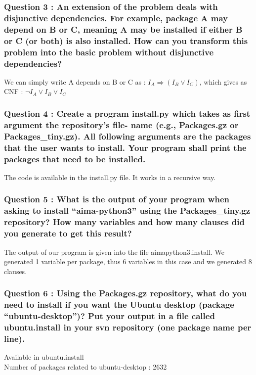 \documentclass[a4paper,10pt]{article}
\begin{document}
\subsubsection{Question 3 : An extension of the problem deals with disjunctive dependencies. For example, package A may depend on B or C, meaning A may be installed if either B or C (or both) is also installed. How can you transform this problem into the basic problem without disjunctive dependencies?}
We can simply write A depends on B or C as : $I_{A} \Rightarrow (I_{B} \vee I_{C})$, which gives as CNF : $\neg I_{A} \vee I_{B} \vee I_{C}$

\subsubsection{Question 4 : Create a program install.py which takes as first argument the repository’s file- name (e.g., Packages.gz or Packages\_tiny.gz). All following arguments are the packages that the user wants to install. Your program shall print the packages that need to be installed.}
The code is available in the install.py file. It works in a recursive way.

\subsubsection{Question 5 : What is the output of your program when asking to install “aima-python3” using the Packages\_tiny.gz repository? How many variables and how many clauses did you generate to get this result?}

The output of our program is given into the file aimapython3.install. We generated 1 variable per package, thus 6 variables in this case and we generated 8 clauses.

\subsubsection{Question 6 : Using the Packages.gz repository, what do you need to install if you want the Ubuntu desktop (package “ubuntu-desktop”)? Put your output in a file called ubuntu.install in your svn repository (one package name per line).}

Available in ubuntu.install\\
Number of packages related to ubuntu-desktop : 2632
\end{document}
